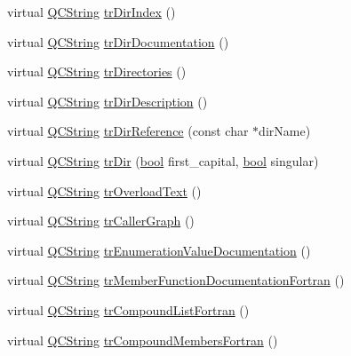 \begin{DoxyCompactItemize}
\item 
virtual \hyperlink{class_q_c_string}{Q\+C\+String} \hyperlink{class_translator_portuguese_aab7cba8ddd3a003584bdd079877c314a}{tr\+Dir\+Index} ()
\item 
virtual \hyperlink{class_q_c_string}{Q\+C\+String} \hyperlink{class_translator_portuguese_a6442eab34e32891d047f1be6b6237b50}{tr\+Dir\+Documentation} ()
\item 
virtual \hyperlink{class_q_c_string}{Q\+C\+String} \hyperlink{class_translator_portuguese_a1d0abb2c68b2a1703056cf567877359e}{tr\+Directories} ()
\item 
virtual \hyperlink{class_q_c_string}{Q\+C\+String} \hyperlink{class_translator_portuguese_af97437d85cb2e8af12c2aaf8157393cd}{tr\+Dir\+Description} ()
\item 
virtual \hyperlink{class_q_c_string}{Q\+C\+String} \hyperlink{class_translator_portuguese_a4a104b57f0aff72824762e51cb3b4ae9}{tr\+Dir\+Reference} (const char $\ast$dir\+Name)
\item 
virtual \hyperlink{class_q_c_string}{Q\+C\+String} \hyperlink{class_translator_portuguese_a56f16c40c6518a8c0b05415a4dbacfd2}{tr\+Dir} (\hyperlink{qglobal_8h_a1062901a7428fdd9c7f180f5e01ea056}{bool} first\+\_\+capital, \hyperlink{qglobal_8h_a1062901a7428fdd9c7f180f5e01ea056}{bool} singular)
\item 
virtual \hyperlink{class_q_c_string}{Q\+C\+String} \hyperlink{class_translator_portuguese_a321dbe0ca379b243532329d3e01a4489}{tr\+Overload\+Text} ()
\item 
virtual \hyperlink{class_q_c_string}{Q\+C\+String} \hyperlink{class_translator_portuguese_afb7c39aea2eecd206678561da247d9c8}{tr\+Caller\+Graph} ()
\item 
virtual \hyperlink{class_q_c_string}{Q\+C\+String} \hyperlink{class_translator_portuguese_abc195d606fac92023893842cc4eb04d8}{tr\+Enumeration\+Value\+Documentation} ()
\item 
virtual \hyperlink{class_q_c_string}{Q\+C\+String} \hyperlink{class_translator_portuguese_a235d508ee0e4f9611c5b3e5b562fda74}{tr\+Member\+Function\+Documentation\+Fortran} ()
\item 
virtual \hyperlink{class_q_c_string}{Q\+C\+String} \hyperlink{class_translator_portuguese_a5b6d246dc1df2ca8c62f69594858a4ce}{tr\+Compound\+List\+Fortran} ()
\item 
virtual \hyperlink{class_q_c_string}{Q\+C\+String} \hyperlink{class_translator_portuguese_afac21e3d9033517a4a53923b40241a56}{tr\+Compound\+Members\+Fortran} ()
\item 

\end{DoxyCompactItemize}
